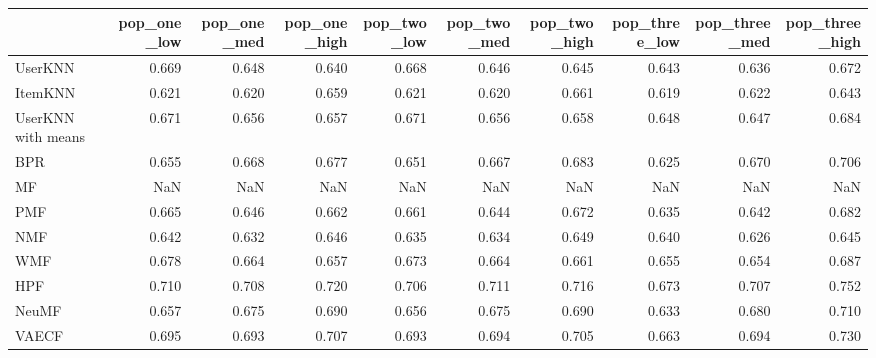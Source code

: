 \begin{tabular}{lrrrrrrrrr}
\toprule
{} &  pop\_one\_low &  pop\_one\_med &  pop\_one\_high &  pop\_two\_low &  pop\_two\_med &  pop\_two\_high &  pop\_three\_low &  pop\_three\_med &  pop\_three\_high \\
\midrule
UserKNN            &        0.669 &        0.648 &         0.640 &        0.668 &        0.646 &         0.645 &          0.643 &          0.636 &           0.672 \\
ItemKNN            &        0.621 &        0.620 &         0.659 &        0.621 &        0.620 &         0.661 &          0.619 &          0.622 &           0.643 \\
UserKNN with means &        0.671 &        0.656 &         0.657 &        0.671 &        0.656 &         0.658 &          0.648 &          0.647 &           0.684 \\
BPR                &        0.655 &        0.668 &         0.677 &        0.651 &        0.667 &         0.683 &          0.625 &          0.670 &           0.706 \\
MF                 &          NaN &          NaN &           NaN &          NaN &          NaN &           NaN &            NaN &            NaN &             NaN \\
PMF                &        0.665 &        0.646 &         0.662 &        0.661 &        0.644 &         0.672 &          0.635 &          0.642 &           0.682 \\
NMF                &        0.642 &        0.632 &         0.646 &        0.635 &        0.634 &         0.649 &          0.640 &          0.626 &           0.645 \\
WMF                &        0.678 &        0.664 &         0.657 &        0.673 &        0.664 &         0.661 &          0.655 &          0.654 &           0.687 \\
HPF                &        0.710 &        0.708 &         0.720 &        0.706 &        0.711 &         0.716 &          0.673 &          0.707 &           0.752 \\
NeuMF              &        0.657 &        0.675 &         0.690 &        0.656 &        0.675 &         0.690 &          0.633 &          0.680 &           0.710 \\
VAECF              &        0.695 &        0.693 &         0.707 &        0.693 &        0.694 &         0.705 &          0.663 &          0.694 &           0.730 \\
\bottomrule
\end{tabular}
